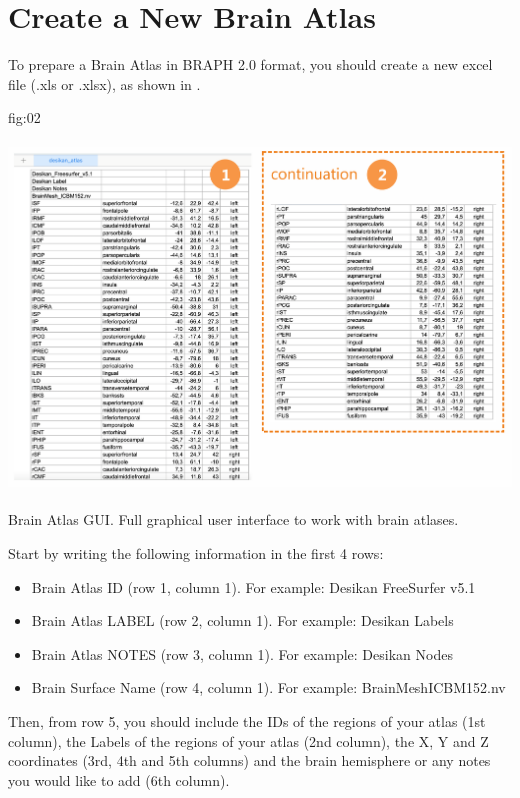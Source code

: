 \documentclass[justified]{tufte-handout}
\begin{document}
\clearpage
\section{Create a New Brain Atlas}

To prepare a Brain Atlas in BRAPH 2.0 format, you should create a new excel file (.xls or .xlsx), as shown in . 

	{fig:02}
	{\includegraphics[height=10cm]{tut_ba/fig2.png}}
	{Brain Atlas GUI.}
	{
	Full graphical user interface to work with brain atlases. 
	}

Start by writing the following information in the first 4 rows:
\begin{itemize}

\item Brain Atlas ID (row 1, column 1). 
For example: Desikan FreeSurfer v5.1

\item Brain Atlas LABEL (row 2, column 1). 
For example: Desikan Labels

\item Brain Atlas NOTES (row 3, column 1).
For example: Desikan Nodes

\item Brain Surface Name (row 4, column 1).
For example: BrainMeshICBM152.nv

\end{itemize}
Then, from row 5, you should include the IDs of the regions of your atlas (1st column), the Labels of the regions of your atlas (2nd column), the X, Y and Z coordinates (3rd, 4th and 5th columns) and the brain hemisphere or any notes you would like to add (6th column).	
\end{document}
